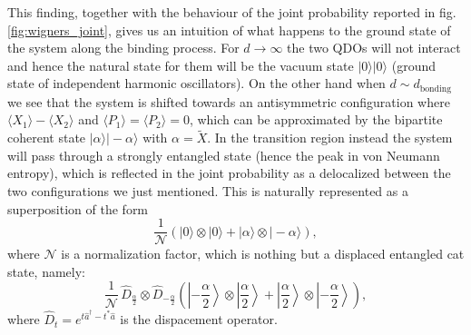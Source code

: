 \documentclass[reprint, amsmath, amssymb, floatfix, aps, pra]{revtex4-2}
\newcommand{\ket}[1]{|#1\rangle}
\begin{document}
    This finding, together with the behaviour of the joint probability reported in fig. \ref{fig:wigners_joint}, gives us an intuition of what happens to the ground state of the system along the binding process. For $d\rightarrow \infty$ the two QDOs will not interact and hence the natural state for them will be the vacuum state $\ket{0}\ket{0}$ (ground state of independent harmonic oscillators). On the other hand when $d \sim d_{\mathrm{bonding}}$ we see that the system is shifted towards an antisymmetric configuration where $\langle X_1\rangle -\langle X_2\rangle$ and $\langle P_1\rangle = \langle P_2\rangle = 0$, which can be approximated by the bipartite coherent state $\ket{\alpha}\ket{-\alpha}$ with $\alpha = \tilde{X}$. In the transition region instead the system will pass through a strongly entangled state (hence the peak in von Neumann entropy), which is reflected in the joint probability as a delocalized between the two configurations we just mentioned. This is naturally represented as a superposition of the form
    \begin{equation*}
        \frac{1}{\mathcal{N}}\left(\ket{0}\otimes\ket{0} + \ket{\alpha}\otimes\ket{-\alpha}\right),
    \end{equation*}
    where $\mathcal{N}$ is a normalization factor, which is nothing but a displaced entangled cat state, namely:
    \begin{equation*}
        \frac{1}{\mathcal{N}}\,\hat{D}_{\frac{\alpha}{2}}\otimes\hat{D}_{-\frac{\alpha}{2}}\left(\left|-\frac{\alpha}{2}\right\rangle\otimes\left|\frac{\alpha}{2}\right\rangle + \left|\frac{\alpha}{2}\right\rangle\otimes\left|-\frac{\alpha}{2}\right\rangle\right),
    \end{equation*}
    where $\hat{D}_{t} = e^{t\hat{a}^{\dagger} - t^{*}\hat{a}}$ is the dispacement operator.
\end{document}
